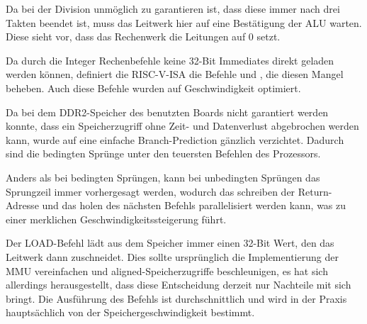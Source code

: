 Da bei der Division unm\"oglich zu garantieren ist, dass diese immer nach drei
Takten beendet ist, muss das Leitwerk hier auf eine Best\"atigung der ALU
warten. Diese sieht vor, dass das Rechenwerk die Leitungen 
auf 0 setzt.


Da durch die Integer Rechenbefehle keine 32-Bit Immediates direkt geladen werden
k\"onnen, definiert die RISC-V-ISA die Befehle  und , die
diesen Mangel beheben. Auch diese Befehle wurden auf Geschwindigkeit optimiert.


Da bei dem DDR2-Speicher des benutzten Boards nicht garantiert werden
konnte, dass ein Speicherzugriff ohne Zeit- und Datenverlust abgebrochen
werden kann, wurde auf eine einfache Branch-Prediction g\"anzlich verzichtet.
Dadurch sind die bedingten Spr\"unge unter den teuersten Befehlen des
Prozessors.



Anders als bei bedingten Spr\"ungen, kann bei unbedingten Spr\"ungen das
Sprungzeil immer vorhergesagt werden, wodurch das schreiben der Return-Adresse
und das holen des n\"achsten Befehls parallelisiert werden kann, was zu einer
merklichen Geschwindigkeitssteigerung f\"uhrt.


Der LOAD-Befehl l\"adt aus dem Speicher immer einen 32-Bit Wert, den das
Leitwerk dann zuschneidet. Dies sollte urspr\"unglich die Implementierung der
MMU vereinfachen und aligned-Speicherzugriffe beschleunigen, es hat sich
allerdings herausgestellt, dass diese Entscheidung derzeit nur Nachteile mit
sich bringt. Die Ausf\"uhrung des Befehls ist durchschnittlich und wird in der
Praxis haupts\"achlich von der Speichergeschwindigkeit bestimmt.


